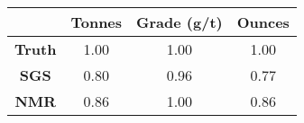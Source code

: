 \begin{tabular}{cccc}
\toprule
{} &   Tonnes &  Grade (g/t) &  Ounces \\
\midrule
\textbf{Truth} & 1.00 &   1.00 &  1.00 \\
\textbf{SGS  } & 0.80 &   0.96 &  0.77 \\
\textbf{NMR  } & 0.86 &   1.00 &  0.86 \\
\bottomrule
\end{tabular}
